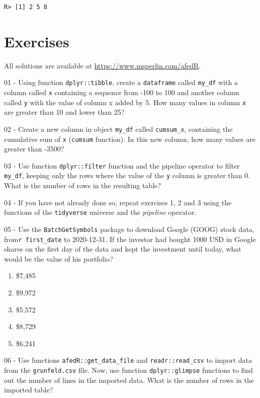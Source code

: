 \documentclass[
  12pt,
]{book}
\providecommand{\tightlist}{%
  \setlength{\itemsep}{0pt}\setlength{\parskip}{0pt}}
\begin{document}
\begin{verbatim}
R> [1] 2 5 8
\end{verbatim}

\hypertarget{exercises-3}{%
\section{Exercises}\label{exercises-3}}

All solutions are available at \url{https://www.msperlin.com/afedR}.

01 -
Using function \texttt{dplyr::tibble}, create a \texttt{dataframe} called \texttt{my\_df} with a column called \texttt{x} containing a sequence from -100 to 100 and another column called \texttt{y} with the value of column x added by 5. How many values in column \texttt{x} are greater than 10 and lower than 25?

02 -
Create a new column in object \texttt{my\_df} called \texttt{cumsum\_x}, containing the cumulative sum of \texttt{x} (\texttt{cumsum} function). In this new column, how many values are greater than -3500?

03 -
Use function \texttt{dplyr::filter} function and the pipeline operator to filter \texttt{my\_df}, keeping only the rows where the value of the \texttt{y} column is greater than 0. What is the number of rows in the resulting table?

04 -
If you have not already done so, repeat exercises 1, 2 and 3 using the functions of the \texttt{tidyverse} universe and the \emph{pipeline} operator.

05 -
Use the \texttt{BatchGetSymbols} package to download Google (GOOG) stock data, from\texttt{r\ first\_date} to 2020-12-31. If the investor had bought 1000 USD in Google shares on the first day of the data and kept the investment until today, what would be the value of his portfolio?

\begin{enumerate}
\def\labelenumi{\alph{enumi})}
\tightlist
\item
  \$7,485
\item
  \$9,972
\item
  \$5,572
\item
  \$8,729
\item
  \$6,241
\end{enumerate}

06 -
Use functions \texttt{afedR::get\_data\_file} and \texttt{readr::read\_csv} to import data from the \texttt{grunfeld.csv} file. Now, use function \texttt{dplyr::glimpse} functions to find out the number of lines in the imported data. What is the number of rows in the imported table?
\end{document}
